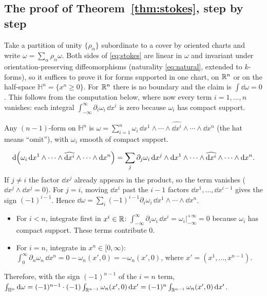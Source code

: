 \subsection{The proof of Theorem~\ref{thm:stokes}, step by step}\label{sec:stokesproof}

 Take a partition of unity $\{\rho_\alpha\}$ subordinate to a cover by oriented charts and write $\omega=\sum_\alpha\rho_\alpha\omega$. Both sides of \eqref{eq:stokes} are linear in $\omega$ and invariant under orientation-preserving diffeomorphisms (naturality \eqref{eq:natural}, extended to $k$-forms), so it suffices to prove it for forms supported in one chart, \ie on $\mathbb{R}^n$ or on the half-space $\mathbb H^n=\{x^n\ge0\}$. For $\mathbb{R}^n$ there is no boundary and the claim is $\int\dd\omega=0$. This follows from the computation below, where now every term $i=1,\dots,n$ vanishes: each integral $\int_{-\infty}^\infty\partial_i\omega_i\,\dd x^i$ is zero because $\omega_i$ has compact support.

 Any $(n-1)$-form on $\mathbb H^n$ is $\omega=\sum_{i=1}^n\omega_i\,\dd x^1\wedge\cdots\wedge\widehat{\dd x^i}\wedge\cdots\wedge\dd x^n$ (the hat means ``omit''), with $\omega_i$ smooth of compact support.

\[
\mathrm{d}\Bigl(\omega_i\,\mathrm{d} x^1\wedge\cdots\wedge\widehat{\mathrm{d} x^i}\wedge\cdots\wedge\mathrm{d} x^n\Bigr)=\sum_j\partial_j\omega_i\,\mathrm{d} x^j\wedge\mathrm{d} x^1\wedge\cdots\wedge\widehat{\mathrm{d} x^i}\wedge\cdots\wedge\mathrm{d} x^n .
\]
If $j\ne i$ the factor $\dd x^j$ already appears in the product, so the term vanishes ($\dd x^j\wedge\dd x^j=0$). For $j=i$, moving $\dd x^i$ past the $i-1$ factors $\dd x^1,\dots,\dd x^{i-1}$ gives the sign $(-1)^{i-1}$. Hence $\dd\omega=\sum_i(-1)^{i-1}\partial_i\omega_i\,\dd x^1\wedge\cdots\wedge\dd x^n$.

\begin{itemize}
\item For $i<n$, integrate first in $x^i\in\mathbb{R}$: $\int_{-\infty}^{\infty}\partial_i\omega_i\,\dd x^i=\omega_i\big|_{-\infty}^{+\infty}=0$ because $\omega_i$ has compact support. These terms contribute $0$.
\item For $i=n$, integrate in $x^n\in[0,\infty)$: $\int_0^\infty\partial_n\omega_n\,\dd x^n=0-\omega_n(x',0)=-\omega_n(x',0)$, where $x'=(x^1,\dots,x^{n-1})$.
\end{itemize}
Therefore, with the sign $(-1)^{n-1}$ of the $i=n$ term, $\int_{\mathbb H^n}\mathrm{d}\omega=(-1)^{n-1}\cdot(-1)\int_{\mathbb{R}^{n-1}}\omega_n(x',0)\,\mathrm{d} x'=(-1)^n\int_{\mathbb{R}^{n-1}}\omega_n(x',0)\,\mathrm{d} x'$.

